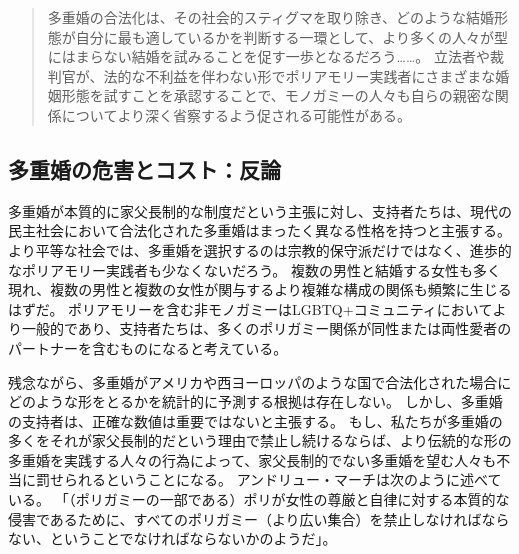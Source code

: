 \documentclass[paper=a4,book,openany]{jlreq}
\begin{document}
\begin{quote}
多重婚の合法化は、その社会的スティグマを取り除き、どのような結婚形態が自分に最も適しているかを判断する一環として、より多くの人々が型にはまらない結婚を試みることを促す一歩となるだろう……。
立法者や裁判官が、法的な不利益を伴わない形でポリアモリー実践者にさまざまな婚姻形態を試すことを承認することで、モノガミーの人々も自らの親密な関係についてより深く省察するよう促される可能性がある。
\citep{otter18:_perfec_argum_legal_recog_polyam_relat}
\end{quote}

\subsection{多重婚の危害とコスト：反論}

多重婚が本質的に家父長制的な制度だという主張に対し、支持者たちは、現代の民主社会において合法化された多重婚はまったく異なる性格を持つと主張する。
より平等な社会では、多重婚を選択するのは宗教的保守派だけではなく、進歩的なポリアモリー実践者も少なくないだろう。
複数の男性と結婚する女性も多く現れ、複数の男性と複数の女性が関与するより複雑な構成の関係も頻繁に生じるはずだ。
ポリアモリーを含む非モノガミーはLGBTQ+コミュニティにおいてより一般的であり、支持者たちは、多くのポリガミー関係が同性または両性愛者のパートナーを含むものになると考えている。

残念ながら、多重婚がアメリカや西ヨーロッパのような国で合法化された場合にどのような形をとるかを統計的に予測する根拠は存在しない。
しかし、多重婚の支持者は、正確な数値は重要ではないと主張する。
もし、私たちが多重婚の多くをそれが家父長制的だという理由で禁止し続けるならば、より伝統的な形の多重婚を実践する人々の行為によって、家父長制的でない多重婚を望む人々も不当に罰せられるということになる。
アンドリュー・マーチは次のように述べている。
「（ポリガミーの一部である）ポリが女性の尊厳と自律に対する本質的な侵害であるために、すべてのポリガミー（より広い集合）を禁止しなければならない、ということでなければならないかのようだ」\citep{march11:_is_there_right_polyg}。
\end{document}
